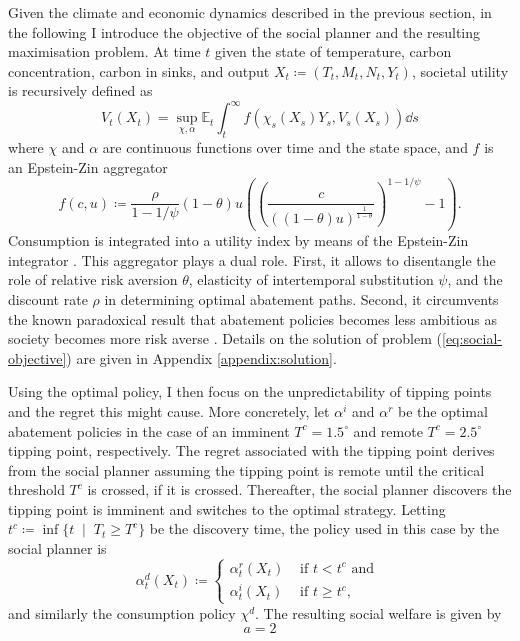 \documentclass[../../main.tex]{subfiles}
\begin{document}
Given the climate and economic dynamics described in the previous section, in the following I introduce the objective of the social planner and the resulting maximisation problem. At time $t$ given the state of temperature, carbon concentration, carbon in sinks, and output $X_t \coloneqq (T_t, M_t, N_t, Y_t)$, societal utility is recursively defined as \begin{equation} \label{eq:social-objective}
    V_t(X_t) = \sup_{\chi, \alpha} \mathbb{E}_t 
    \int_{t}^{\infty} f(\chi_s(X_s) Y_s, V_s(X_s)) \dd{s}
\end{equation} where $\chi$ and $\alpha$ are continuous functions over time and the state space, and $f$ is an Epstein-Zin aggregator \begin{equation} \label{eq:aggregator}
    f(c, u) \coloneqq \frac{\rho}{1 - 1 / \psi} (1 - \theta) u  \left( \left(\frac{c}{((1 - \theta) u)^{\frac{1}{1 - \theta}}}\right)^{1 - 1 / \psi} - 1 \right).
\end{equation} Consumption is integrated into a utility index by means of the Epstein-Zin integrator \citep{duffie_asset_1992}. This aggregator plays a dual role. First, it allows to disentangle the role of relative risk aversion $\theta$, elasticity of intertemporal substitution $\psi$, and the discount rate $\rho$ in determining optimal abatement paths. Second, it circumvents the known paradoxical result that abatement policies becomes less ambitious as society becomes more risk averse \citep{pindyck_economic_2013}. Details on the solution of problem (\ref{eq:social-objective}) are given in Appendix \ref{appendix:solution}. 

Using the optimal policy, I then focus on the unpredictability of tipping points and the regret this might cause. More concretely, let $\alpha^{i}$ and $\alpha^{r}$ be the optimal abatement policies in the case of an imminent $T^c = 1.5^\circ$ and remote $T^c = 2.5^\circ$ tipping point, respectively. The regret associated with the tipping point derives from the social planner assuming the tipping point is remote until the critical threshold $T^c$ is crossed, if it is crossed. Thereafter, the social planner discovers the tipping point is imminent and switches to the optimal strategy. Letting $t^c \coloneqq \inf\{t \; \mid \; T_t \geq T^c \}$ be the discovery time, the policy used in this case by the social planner is \begin{equation}
    \alpha^{d}_t(X_t) \coloneqq \begin{cases}
        \alpha_t^r(X_t) &\text{ if } t < t^c \text{ and } \\
        \alpha_t^i(X_t) &\text{ if } t \geq t^c,
    \end{cases}
\end{equation} and similarly the consumption policy $\chi^d$. The resulting social welfare is given by \begin{equation}
    a = 2
\end{equation}
\end{document}
